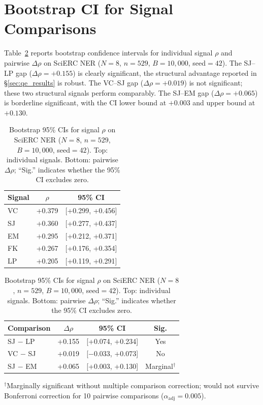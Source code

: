 \section{Bootstrap CI for Signal Comparisons}\label{app:bootstrap_signal}

Table~\ref{tab:bootstrap_signal_ci} reports bootstrap confidence intervals for individual signal $\rho$ and pairwise $\Delta\rho$ on SciERC NER ($N{=}8$, $n{=}529$, $B{=}10{,}000$, seed${=}42$).
The SJ--LP gap ($\Delta\rho{=}{+}0.155$) is clearly significant, the structural advantage reported in \S\ref{sec:qe_results} is robust.
The VC--SJ gap ($\Delta\rho{=}{+}0.019$) is not significant; these two structural signals perform comparably.
The SJ--EM gap ($\Delta\rho{=}{+}0.065$) is borderline significant, with the CI lower bound at $+0.003$ and upper bound at $+0.130$.

\begin{table}[t]
\centering
\small
\caption{Bootstrap 95\% CIs for signal $\rho$ on SciERC NER ($N{=}8$, $n{=}529$, $B{=}10{,}000$, seed${=}42$). Top: individual signals. Bottom: pairwise $\Delta\rho$; ``Sig.'' indicates whether the 95\% CI excludes zero.}
\label{tab:bootstrap_signal_ci}
\begin{tabular}{lcc}
\toprule
Signal & $\rho$ & 95\% CI \\
\midrule
VC & +0.379 & [+0.299, +0.456] \\
SJ & +0.360 & [+0.277, +0.437] \\
EM & +0.295 & [+0.212, +0.371] \\
FK & +0.267 & [+0.176, +0.354] \\
LP & +0.205 & [+0.119, +0.291] \\
\bottomrule
\end{tabular}

\vspace{0.5em}

\begin{tabular}{lccc}
\toprule
Comparison & $\Delta\rho$ & 95\% CI & Sig. \\
\midrule
SJ $-$ LP & +0.155 & [+0.074, +0.234] & Yes \\
VC $-$ SJ & +0.019 & [$-$0.033, +0.073] & No \\
SJ $-$ EM & +0.065 & [+0.003, +0.130] & Marginal$^\dagger$ \\
\bottomrule
\end{tabular}

\smallskip
{\footnotesize $^\dagger$Marginally significant without multiple comparison correction; would not survive Bonferroni correction for 10 pairwise comparisons ($\alpha_{\text{adj}}{=}0.005$).}
\end{table}

